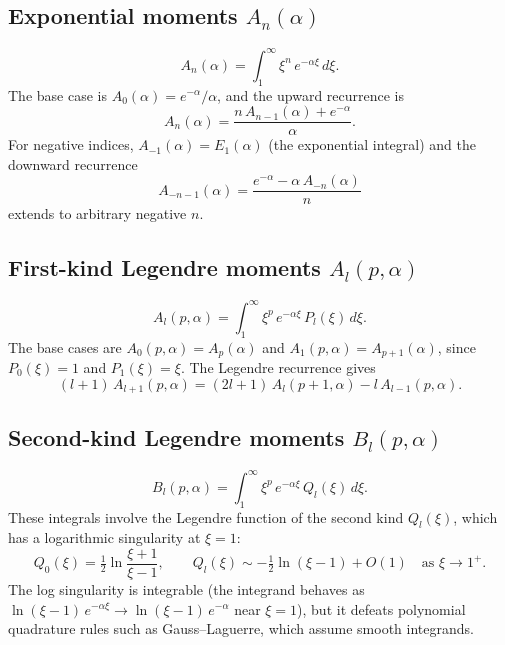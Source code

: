 \documentclass[aps,pra,twocolumn,superscriptaddress,longbibliography]{revtex4-2}
\begin{document}
\subsection{Exponential moments \texorpdfstring{$A_n(\alpha)$}{An(alpha)}}

\begin{equation}
  A_n(\alpha) = \int_1^\infty\xi^n\,e^{-\alpha\xi}\,d\xi.
  \label{eq:An_def}
\end{equation}
The base case is $A_0(\alpha) = e^{-\alpha}/\alpha$, and the
upward recurrence is
\begin{equation}
  A_n(\alpha) = \frac{n\,A_{n-1}(\alpha) + e^{-\alpha}}{\alpha}.
  \label{eq:An_recurrence}
\end{equation}
For negative indices, $A_{-1}(\alpha) = E_1(\alpha)$
(the exponential integral) and the downward recurrence
\begin{equation}
  A_{-n-1}(\alpha) = \frac{e^{-\alpha} - \alpha\,A_{-n}(\alpha)}{n}
  \label{eq:An_negative}
\end{equation}
extends to arbitrary negative $n$.

\subsection{First-kind Legendre moments
\texorpdfstring{$A_l(p, \alpha)$}{Al(p, alpha)}}

\begin{equation}
  A_l(p, \alpha) = \int_1^\infty\xi^p\,e^{-\alpha\xi}\,
  P_l(\xi)\,d\xi.
  \label{eq:Al_def}
\end{equation}
The base cases are $A_0(p,\alpha) = A_p(\alpha)$ and
$A_1(p,\alpha) = A_{p+1}(\alpha)$, since $P_0(\xi) = 1$
and $P_1(\xi) = \xi$.  The Legendre recurrence gives
\begin{equation}
  (l+1)\,A_{l+1}(p,\alpha) = (2l+1)\,A_l(p+1,\alpha) - l\,A_{l-1}(p,\alpha).
  \label{eq:Al_recurrence}
\end{equation}

\subsection{Second-kind Legendre moments
\texorpdfstring{$B_l(p, \alpha)$}{Bl(p, alpha)}}

\begin{equation}
  B_l(p, \alpha) = \int_1^\infty\xi^p\,e^{-\alpha\xi}\,
  Q_l(\xi)\,d\xi.
  \label{eq:Bl_def}
\end{equation}
These integrals involve the Legendre function of the second
kind $Q_l(\xi)$, which has a logarithmic singularity at
$\xi = 1$:
\begin{equation}
  Q_0(\xi) = \tfrac{1}{2}\ln\frac{\xi+1}{\xi-1},
  \qquad Q_l(\xi) \sim -\tfrac{1}{2}\ln(\xi-1) + O(1)
  \quad\text{as }\xi\to 1^+.
  \label{eq:Ql_singularity}
\end{equation}
The log singularity is integrable (the integrand behaves as
$\ln(\xi-1)\,e^{-\alpha\xi} \to \ln(\xi-1)\,e^{-\alpha}$
near $\xi = 1$), but it defeats polynomial quadrature rules
such as Gauss--Laguerre, which assume smooth integrands.
\end{document}
